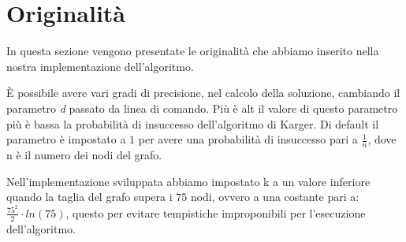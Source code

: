 \chapter{Originalità\label{sec:originalita}}
\noindent In questa sezione vengono presentate le originalità che abbiamo inserito nella nostra implementazione dell'algoritmo.

È possibile avere vari gradi di precisione, nel calcolo della soluzione, cambiando il parametro \textit{d} passato da linea di comando. Più è alt il valore di questo parametro più è bassa la probabilità di insuccesso dell'algoritmo di Karger.
Di default il parametro è impostato a $1$ per avere una probabilità di insuccesso pari a \(\frac{1}{n}\), dove n è il numero dei nodi del grafo.

Nell'implementazione sviluppata abbiamo impostato k a un valore inferiore quando la taglia del grafo supera i $75$ nodi, ovvero a una costante pari a: \(\frac{75^{2}}{2}\cdot ln(75)\), questo per evitare tempistiche improponibili per l'esecuzione dell'algoritmo.
